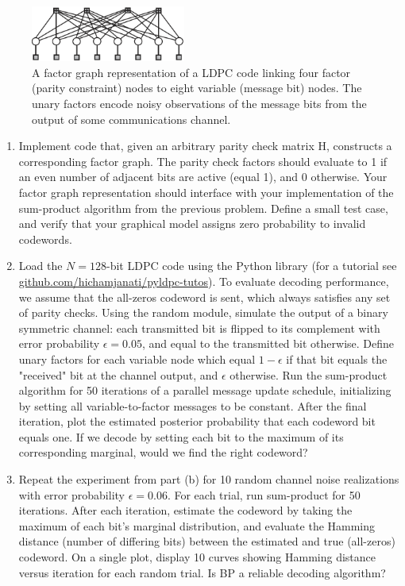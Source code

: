 \documentclass{article}
\begin{document}
\begin{enumerate}
\begin{figure}[t]
\centering
\includegraphics[width=2in]{brown_hw2}
\caption{A factor graph representation of a LDPC code linking four factor (parity constraint)
nodes to eight variable (message bit) nodes. The unary factors encode noisy observations of the
message bits from the output of some communications channel.}
\label{fig:factor}
\end{figure}

\begin{enumerate}
\item Implement code that, given an arbitrary parity check matrix H, constructs a corresponding factor graph. The parity check factors should evaluate to 1 if an even number of adjacent bits are active (equal 1), and 0 otherwise. Your factor graph representation should interface with your implementation of the sum-product algorithm from the previous problem. Define a small test case, and verify that your graphical model assigns zero probability to invalid codewords.
\item Load the $N = 128$-bit LDPC code using the Python library  (for a tutorial see \url {github.com/hichamjanati/pyldpc-tutos}).  To evaluate decoding
performance, we assume that the all-zeros codeword is sent, which always satisfies any set of parity checks. Using the random module, simulate the output of a binary symmetric
channel: each transmitted bit is flipped to its complement with error probability $\epsilon =0.05$, and equal to the transmitted bit otherwise. Define unary factors for each variable node
which equal $1-\epsilon$ if that bit equals the "received" bit at the channel output, and $\epsilon$ otherwise. Run the sum-product algorithm for 50 iterations of a parallel message update schedule, initializing by setting all variable-to-factor messages to be constant. After the final iteration, plot the estimated posterior probability that each codeword bit equals one.
If we decode by setting each bit to the maximum of its corresponding marginal, would we find the right codeword?
\item Repeat the experiment from part (b) for 10 random channel noise realizations with error probability $\epsilon= 0.06$. For each trial, run sum-product for 50 iterations. After each iteration, estimate the codeword by taking the maximum of each bit's marginal distribution, and evaluate the Hamming distance (number of differing bits) between the estimated and true (all-zeros) codeword. On a single plot, display 10 curves showing Hamming distance versus iteration for each random trial. Is BP a reliable decoding algorithm?

\end{enumerate}
\end{enumerate}
\end{document}
